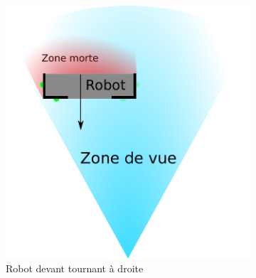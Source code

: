 \begin{itemize}
\begin{figure}[H]
					    ~
						\begin{subfigure}[h]{0.35\textwidth}
					        \includegraphics[width=\textwidth]{Graphics/casClignotants_AD.pdf}
					        \caption{Robot devant tournant à droite}
					    \end{subfigure}
					    ~
					    \begin{subfigure}[h]{0.2\textwidth}

\end{subfigure}
\end{figure}
\end{itemize}
